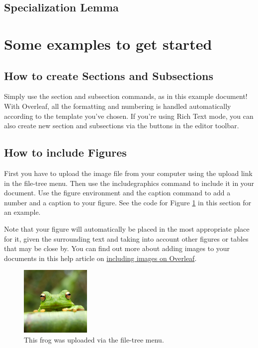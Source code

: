 \documentclass{article}
\begin{document}
\subsection{Specialization Lemma}

\section{Some examples to get started}

\subsection{How to create Sections and Subsections}

Simply use the section and subsection commands, as in this example document! With Overleaf, all the formatting and numbering is handled automatically according to the template you've chosen. If you're using Rich Text mode, you can also create new section and subsections via the buttons in the editor toolbar.

\subsection{How to include Figures}

First you have to upload the image file from your computer using the upload link in the file-tree menu. Then use the includegraphics command to include it in your document. Use the figure environment and the caption command to add a number and a caption to your figure. See the code for Figure \ref{fig:frog} in this section for an example.

Note that your figure will automatically be placed in the most appropriate place for it, given the surrounding text and taking into account other figures or tables that may be close by. You can find out more about adding images to your documents in this help article on \href{https://www.overleaf.com/learn/how-to/Including_images_on_Overleaf}{including images on Overleaf}.

\begin{figure}
\centering
\includegraphics[width=0.3\textwidth]{frog.jpg}
\caption{\label{fig:frog}This frog was uploaded via the file-tree menu.}
\end{figure}
\end{document}
